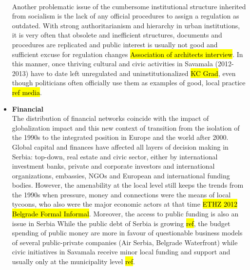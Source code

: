 \documentclass[11pt]{report}
\begin{document}
\begin{itemize}
\\
Another problematic issue of the cumbersome institutional structure inherited from socialism is the lack of any official procedures to assign a regulation as outdated.
With strong authoritarianism and hierarchy in urban institutions, it is very often that obsolete and inefficient structures, documents and procedures are replicated and public interest is usually not good and sufficient excuse for regulation changes \hl{Association of architects interview}.
In this manner, once thriving cultural and civic activities in Savamala (2012-2013) have to date left unregulated and uninstitutionalized \hl{KC Grad}, even though politicians often officially use them as examples of good, local practice \hl{ref media}.

\item \textbf{Financial}
\\
The distribution of financial networks coincide with the impact of globalization impact and this new context of transition from the isolation of the 1990s to the integrated position in Europe and the world after 2000.
Global capital and finances have affected all layers of decision making in Serbia: top-down, real estate and civic sector, either by international investment banks, private and corporate investors and international organizations, embassies, NGOs and European and international funding bodies.
However, the amenability at the local level still keeps the trends from the 1990s when pressure, money and connections were the means of local tycoons, who also were the major economic actors at that time \hl{ETHZ 2012 Belgrade Formal Informal}.
Moreover, the access to public funding is also an issue in Serbia
While the public debt of Serbia is growing \hl{ref}, the budget spending of public money are more in favour of questionable business models of several public-private companies (Air Serbia, Belgrade Waterfront) while civic initiatives in Savamala receive minor local funding and support and usually only at the municipality level \hl{ref}.
\end{itemize}
\end{document}
